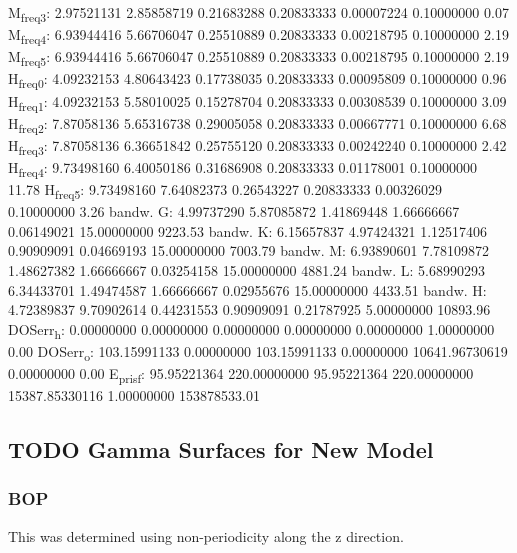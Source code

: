 \documentclass[11pt]{article}
\begin{document}
M\textsubscript{freq}\textsubscript{3}:   2.97521131   2.85858719   0.21683288   0.20833333   0.00007224   0.10000000         0.07
M\textsubscript{freq}\textsubscript{4}:   6.93944416   5.66706047   0.25510889   0.20833333   0.00218795   0.10000000         2.19
M\textsubscript{freq}\textsubscript{5}:   6.93944416   5.66706047   0.25510889   0.20833333   0.00218795   0.10000000         2.19
H\textsubscript{freq}\textsubscript{0}:   4.09232153   4.80643423   0.17738035   0.20833333   0.00095809   0.10000000         0.96
H\textsubscript{freq}\textsubscript{1}:   4.09232153   5.58010025   0.15278704   0.20833333   0.00308539   0.10000000         3.09
H\textsubscript{freq}\textsubscript{2}:   7.87058136   5.65316738   0.29005058   0.20833333   0.00667771   0.10000000         6.68
H\textsubscript{freq}\textsubscript{3}:   7.87058136   6.36651842   0.25755120   0.20833333   0.00242240   0.10000000         2.42
H\textsubscript{freq}\textsubscript{4}:   9.73498160   6.40050186   0.31686908   0.20833333   0.01178001   0.10000000        11.78
H\textsubscript{freq}\textsubscript{5}:   9.73498160   7.64082373   0.26543227   0.20833333   0.00326029   0.10000000         3.26
bandw. G:   4.99737290   5.87085872   1.41869448   1.66666667   0.06149021  15.00000000      9223.53
bandw. K:   6.15657837   4.97424321   1.12517406   0.90909091   0.04669193  15.00000000      7003.79
bandw. M:   6.93890601   7.78109872   1.48627382   1.66666667   0.03254158  15.00000000      4881.24
bandw. L:   5.68990293   6.34433701   1.49474587   1.66666667   0.02955676  15.00000000      4433.51
bandw. H:   4.72389837   9.70902614   0.44231553   0.90909091   0.21787925   5.00000000     10893.96
DOSerr\textsubscript{h}:   0.00000000   0.00000000   0.00000000   0.00000000   0.00000000   1.00000000         0.00
DOSerr\textsubscript{o}: 103.15991133   0.00000000 103.15991133   0.00000000 10641.96730619   0.00000000         0.00
E\textsubscript{pris}\textsubscript{f}:  95.95221364 220.00000000  95.95221364 220.00000000 15387.85330116   1.00000000 153878533.01

\subsection{{\bfseries\sffamily TODO} Gamma Surfaces for New Model}
\label{sec:orgc876f1b}
\subsubsection{BOP}
\label{sec:org7472587}
This was determined using non-periodicity along the z direction. 
\end{document}

